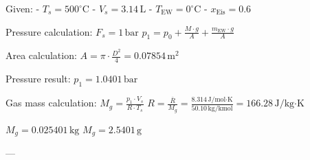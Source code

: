 Given:  
- \( T_s = 500^\circ \text{C} \)  
- \( V_s = 3.14 \, \text{L} \)  
- \( T_{\text{EW}} = 0^\circ \text{C} \)  
- \( x_{\text{Eis}} = 0.6 \)  

Pressure calculation:  
\( F_s = 1 \, \text{bar} \)  
\( p_1 = p_0 + \frac{M \cdot g}{A} + \frac{m_{\text{EW}} \cdot g}{A} \)  

Area calculation:  
\( A = \pi \cdot \frac{D^2}{4} = 0.07854 \, \text{m}^2 \)  

Pressure result:  
\( p_1 = 1.0401 \, \text{bar} \)  

Gas mass calculation:  
\( M_g = \frac{p_1 \cdot V_s}{R \cdot T_s} \)  
\( R = \frac{\bar{R}}{M_g} = \frac{8.314 \, \text{J/mol·K}}{50.10 \, \text{kg/kmol}} = 166.28 \, \text{J/kg·K} \)  

\( M_g = 0.025401 \, \text{kg} \)  
\( M_g = 2.5401 \, \text{g} \)  

---